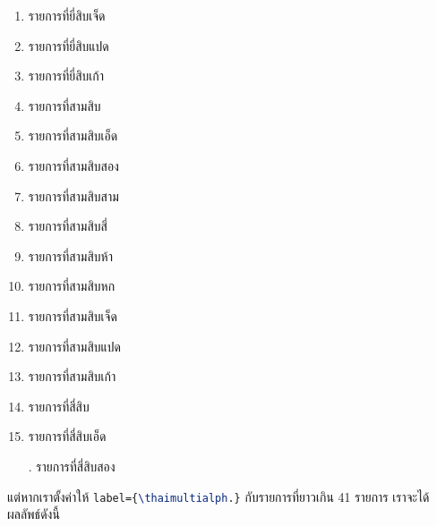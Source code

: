 \documentclass[11pt]{ltxguide}
\begin{document}
\begin{multicols}{4}
\begin{enumerate}[listparindent=0pc,topsep=0pc,itemsep=0pc,label={\thaialph*.}]
        \item  รายการ{\wbr}ที่{\wbr}ยี่{\wbr}สิบ{\wbr}เจ็ด{\wbr}
        \item  รายการ{\wbr}ที่{\wbr}ยี่{\wbr}สิบ{\wbr}แปด{\wbr}
        \item  รายการ{\wbr}ที่{\wbr}ยี่{\wbr}สิบ{\wbr}เก้า{\wbr}
        \item  รายการ{\wbr}ที่{\wbr}สาม{\wbr}สิบ{\wbr}
        \item  รายการ{\wbr}ที่{\wbr}สาม{\wbr}สิบ{\wbr}เอ็ด{\wbr}
        \item  รายการ{\wbr}ที่{\wbr}สาม{\wbr}สิบ{\wbr}สอง{\wbr}
        \item  รายการ{\wbr}ที่{\wbr}สาม{\wbr}สิบ{\wbr}สาม{\wbr}
        \item  รายการ{\wbr}ที่{\wbr}สาม{\wbr}สิบ{\wbr}สี่{\wbr}
        \item  รายการ{\wbr}ที่{\wbr}สาม{\wbr}สิบ{\wbr}ห้า{\wbr}
        \item  รายการ{\wbr}ที่{\wbr}สาม{\wbr}สิบ{\wbr}หก{\wbr}
        \item  รายการ{\wbr}ที่{\wbr}สาม{\wbr}สิบ{\wbr}เจ็ด{\wbr}
        \item  รายการ{\wbr}ที่{\wbr}สาม{\wbr}สิบ{\wbr}แปด{\wbr}
        \item  รายการ{\wbr}ที่{\wbr}สาม{\wbr}สิบ{\wbr}เก้า{\wbr}
        \item  รายการ{\wbr}ที่{\wbr}สี่{\wbr}สิบ{\wbr}
        \item  รายการ{\wbr}ที่{\wbr}สี่{\wbr}สิบ{\wbr}เอ็ด{\wbr}
        \item[.]  รายการ{\wbr}ที่{\wbr}สี่{\wbr}สิบ{\wbr}สอง{\wbr}
    \end{enumerate}
\end{multicols}

\medskip
แต่{\wbr}หาก{\wbr}เรา{\wbr}ตั้ง{\wbr}ค่า{\wbr}ให้ \lstinline[language=LaTeX]!label={\thaimultialph.}! กับ{\wbr}รายการ{\wbr}ที่{\wbr}ยาว{\wbr}เกิน 41 รายการ เรา{\wbr}จะ{\wbr}ได้{\wbr}ผลลัพธ์{\wbr}ดังนี้{\wbr}
\end{document}
